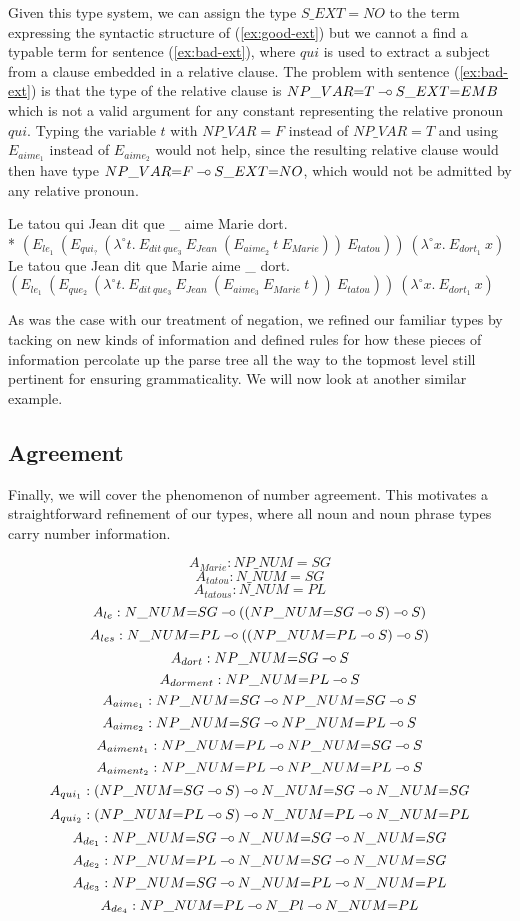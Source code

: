Given this type system, we can assign the type $S\_EXT{=}NO$ to the term
expressing the syntactic structure of (\ref{ex:good-ext}) but we cannot
a find a typable term for sentence (\ref{ex:bad-ext}), where $qui$ is
used to extract a subject from a clause embedded in a relative clause.
The problem with sentence (\ref{ex:bad-ext}) is that the type of the
relative clause is $NP\_VAR{=}T \mathbin{{-}\mkern-3.5mu{\circ}} S\_EXT{=}EMB$ which is not a valid
argument for any constant representing the relative pronoun
$qui$. Typing the variable $t$ with $NP\_VAR{=}F$ instead of
$NP\_VAR{=}T$ and using $E_{aime_1}$ instead of $E_{aime_2}$ would not
help, since the resulting relative clause would then have type
$NP\_VAR{=}F \mathbin{{-}\mkern-3.5mu{\circ}} S\_EXT{=}NO$, which would not be admitted by any
relative pronoun.

\begin{exe}
  \ex * \label{ex:bad-ext} Le tatou qui Jean dit que \_ aime Marie dort. \\
      * $(E_{le_1}\ (E_{qui_?}\ (\lambda^{\circ} t.\ E_{dit\ que_3}\ E_{Jean}\ (E_{aime_2}\ t\ E_{Marie}))\ E_{tatou}))\ (\lambda^{\circ} x.\ E_{dort_1}\ x)$
  \ex \label{ex:good-ext} Le tatou que Jean dit que Marie aime \_ dort. \\
      $(E_{le_1}\ (E_{que_2}\ (\lambda^{\circ} t.\ E_{dit\ que_3}\ E_{Jean}\ (E_{aime_3}\ E_{Marie}\ t))\ E_{tatou}))\ (\lambda^{\circ} x.\ E_{dort_1}\ x)$
\end{exe}

As was the case with our treatment of negation, we refined our familiar
types by tacking on new kinds of information and defined rules for how
these pieces of information percolate up the parse tree all the way to
the topmost level still pertinent for ensuring grammaticality. We will
now look at another similar example.


\subsection{Agreement}

Finally, we will cover the phenomenon of number agreement. This
motivates a straightforward refinement of our types, where all noun and
noun phrase types carry number information.

$$
A_{Marie} : NP\_NUM{=}SG
$$
$$
A_{tatou} : N\_NUM{=}SG
$$
$$
A_{tatous} : N\_NUM{=}PL
$$
$$
A_{le} : N\_NUM{=}SG \mathbin{{-}\mkern-3.5mu{\circ}} ((NP\_NUM{=}SG \mathbin{{-}\mkern-3.5mu{\circ}} S) \mathbin{{-}\mkern-3.5mu{\circ}} S)
$$
$$
A_{les} : N\_NUM{=}PL \mathbin{{-}\mkern-3.5mu{\circ}} ((NP\_NUM{=}PL \mathbin{{-}\mkern-3.5mu{\circ}} S) \mathbin{{-}\mkern-3.5mu{\circ}} S)
$$
$$
A_{dort} : NP\_NUM{=}SG \mathbin{{-}\mkern-3.5mu{\circ}} S
$$
$$
A_{dorment} : NP\_NUM{=}PL \mathbin{{-}\mkern-3.5mu{\circ}} S
$$
$$
A_{aime_1} : NP\_NUM{=}SG \mathbin{{-}\mkern-3.5mu{\circ}} NP\_NUM{=}SG \mathbin{{-}\mkern-3.5mu{\circ}} S
$$
$$
A_{aime_2} : NP\_NUM{=}SG \mathbin{{-}\mkern-3.5mu{\circ}} NP\_NUM{=}PL \mathbin{{-}\mkern-3.5mu{\circ}} S
$$
$$
A_{aiment_1} : NP\_NUM{=}PL \mathbin{{-}\mkern-3.5mu{\circ}} NP\_NUM{=}SG \mathbin{{-}\mkern-3.5mu{\circ}} S
$$
$$
A_{aiment_2} : NP\_NUM{=}PL \mathbin{{-}\mkern-3.5mu{\circ}} NP\_NUM{=}PL \mathbin{{-}\mkern-3.5mu{\circ}} S
$$
$$
A_{qui_1} : (NP\_NUM{=}SG \mathbin{{-}\mkern-3.5mu{\circ}} S) \mathbin{{-}\mkern-3.5mu{\circ}} N\_NUM{=}SG \mathbin{{-}\mkern-3.5mu{\circ}} N\_NUM{=}SG
$$
$$
A_{qui_2} : (NP\_NUM{=}PL \mathbin{{-}\mkern-3.5mu{\circ}} S) \mathbin{{-}\mkern-3.5mu{\circ}} N\_NUM{=}PL \mathbin{{-}\mkern-3.5mu{\circ}} N\_NUM{=}PL
$$
$$
A_{de_1} : NP\_NUM{=}SG \mathbin{{-}\mkern-3.5mu{\circ}} N\_NUM{=}SG \mathbin{{-}\mkern-3.5mu{\circ}} N\_NUM{=}SG
$$
$$
A_{de_2} : NP\_NUM{=}PL \mathbin{{-}\mkern-3.5mu{\circ}} N\_NUM{=}SG \mathbin{{-}\mkern-3.5mu{\circ}} N\_NUM{=}SG
$$
$$
A_{de_3} : NP\_NUM{=}SG \mathbin{{-}\mkern-3.5mu{\circ}} N\_NUM{=}PL \mathbin{{-}\mkern-3.5mu{\circ}} N\_NUM{=}PL
$$
$$
A_{de_4} : NP\_NUM{=}PL \mathbin{{-}\mkern-3.5mu{\circ}} N\_Pl \mathbin{{-}\mkern-3.5mu{\circ}} N\_NUM{=}PL
$$


